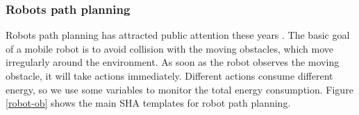 \subsubsection{Robots path planning}
Robots path planning has attracted public attention these years \cite{LWAB10}. The basic goal of a mobile robot is to avoid collision with the moving obstacles, which move irregularly around the environment. As soon as the robot observes the moving obstacle, it will take actions immediately. Different actions consume different energy, so we use some variables to monitor the total energy consumption. Figure \ref{robot-ob} shows the main SHA templates for robot path planning.
\begin{figure}[htbp]
\end{figure}
